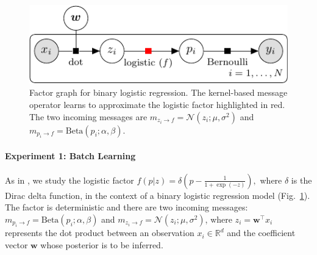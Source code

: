 \documentclass[english]{article}
\theoremstyle{plain}
\theoremstyle{plain}
\newcommand{\factor}{f}				%
\newcommand{\msg}[2]{m_{#1 \rightarrow #2}}			%
\newcommand{\figref}[1]{Fig.~\ref{#1}}
\begin{document}
\begin{figure}[ht]
\centering
\includegraphics[width=0.8\columnwidth]{img/binary_logistic_regression-crop}
%  
%  
\caption{Factor graph for binary logistic regression. 
The kernel-based message operator learns to approximate the logistic factor 
highlighted in red. The two incoming messages are 
$\msg{z_i}{\factor} = \mathcal{N}(z_i; \mu, \sigma^2)$ and 
$\msg{p_i}{\factor} = \text{Beta}(p_i; \alpha, \beta) $. 
}
\label{fig:factor_graph_binlog}
\end{figure}


\paragraph{Experiment 1: Batch Learning} 
As in \citep{Heess2013,Eslami2014}, we study the logistic factor 
$\factor(p|z)=\delta\left(p-\frac{1}{1+\exp(-z)}\right),$ 
%
%
where $\delta$ is the Dirac delta function, in the context of 
a binary logistic regression model  (\figref{fig:factor_graph_binlog}).
The factor is deterministic and there are two incoming messages: 
$\msg{p_i}{\factor} = \text{Beta}(p_i; \alpha, \beta) $ and 
$\msg{z_i}{\factor} = \mathcal{N}(z_i; \mu, \sigma^2)$, 
where $z_i = \boldsymbol{w}^\top x_i$ represents the dot product between an observation 
$x_i \in \mathbb{R}^d$ and the coefficient vector $\boldsymbol{w}$ whose posterior is 
to be inferred.
\end{document}
